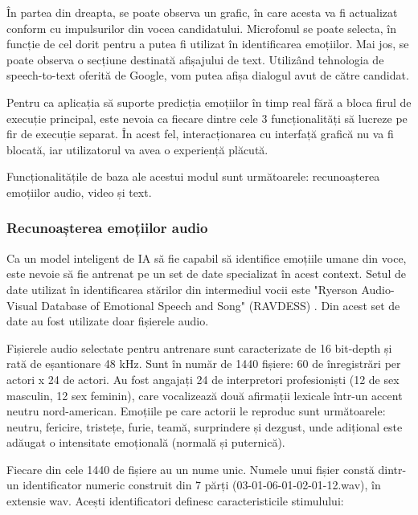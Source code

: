 \documentclass[a4paper, 12pt]{report}
\begin{document}
	În partea din dreapta, se poate observa un grafic, în care acesta va fi actualizat conform cu impulsurilor din vocea candidatului. Microfonul se poate selecta, în funcție de cel dorit pentru a putea fi utilizat în identificarea emoțiilor. Mai jos, se poate observa o secțiune destinată afișajului de text. Utilizând tehnologia de speech-to-text oferită de Google, vom putea afișa dialogul avut de către candidat.
	
	Pentru ca aplicația să suporte predicția emoțiilor în timp real fără a bloca firul de execuție principal, este nevoia ca fiecare dintre cele 3 funcționalități să lucreze pe fir de execuție separat. În acest fel, interacționarea cu interfață grafică nu va fi blocată, iar utilizatorul va avea o experiență plăcută.
	
	Funcționalitățile de baza ale acestui modul sunt următoarele: recunoașterea emoțiilor audio, video și text.	
	
	\subsubsection{Recunoașterea emoțiilor audio}
	Ca un model inteligent de IA să fie capabil să identifice emoțiile umane din voce, este nevoie să fie antrenat pe un set de date specializat în acest context. Setul de date utilizat în identificarea stărilor din intermediul vocii este "Ryerson Audio-Visual Database of Emotional Speech and Song" (RAVDESS) \cite{ravdess}. Din acest set de date au fost utilizate doar fișierele audio.

	Fișierele audio selectate pentru antrenare sunt caracterizate de 16 bit-depth și rată de eșantionare 48 kHz. Sunt în număr de 1440 fișiere: 60 de înregistrări per actori x 24 de actori. Au fost angajați 24 de interpretori profesioniști (12 de sex masculin, 12 sex feminin), care vocalizează două afirmații lexicale într-un accent neutru nord-american. Emoțiile pe care actorii le reproduc sunt următoarele: neutru, fericire, tristețe, furie, teamă, surprindere și dezgust, unde adițional este adăugat o intensitate emoțională (normală și puternică).

	Fiecare din cele 1440 de fișiere au un nume unic. Numele unui fișier constă dintr-un identificator numeric construit din 7 părți (03-01-06-01-02-01-12.wav), în extensie wav. Acești identificatori definesc caracteristicile stimulului:
	
\end{document}

